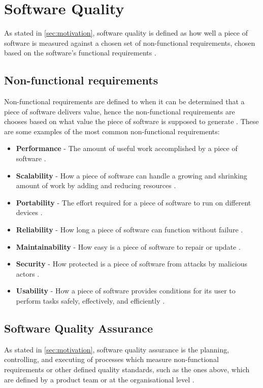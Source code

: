 \section{Software Quality}
As stated in \autoref{sec:motivation}, software quality is defined as how well a piece of software is measured against a chosen set of non-functional requirements, chosen based on the software's functional requirements \cite{iso_25010:2011}. 

\subsection{Non-functional requirements} \label{sec:non_functional_requirments}
Non-functional requirements are defined to when it can be determined that a piece of software delivers value, hence the non-functional requirements are chooses based on what value the piece of software is supposed to generate \cite{iso_25010:2011}. These are some examples of the most common non-functional requirements:

\begin{itemize}
    \item \textbf{Performance} - The amount of useful work accomplished by a piece of software \cite{performance_wiki_2023}.
    \item \textbf{Scalability} - How a piece of software can handle a growing and shrinking amount of work by adding and reducing resources \cite{scalability_wiki_2023}. 
    \item \textbf{Portability} - The effort required for a piece of software to run on different devices \cite{portability_wiki_2023}.
    \item \textbf{Reliability} - How long a piece of software can function without failure \cite{reliability_wiki_2023}.
    \item \textbf{Maintainability} - How easy is a piece of software to repair or update \cite{maintainability_wiki_2023}. 
    \item \textbf{Security} - How protected is a piece of software from attacks by malicious actors \cite{security_wiki_2023}.
    \item \textbf{Usability} - How a piece of software provides conditions for its user to perform tasks safely, effectively, and efficiently \cite{usability_wiki_2023}.
\end{itemize}

\subsection{Software Quality Assurance}
As stated in \autoref{sec:motivation}, software quality assurance is the planning, controlling, and executing of processes which measure non-functional requirements or other defined quality standards, such as the ones above, which are defined by a product team or at the organisational level \cite{ieee_730_2014}\cite{sqa_wiki_2023}.

